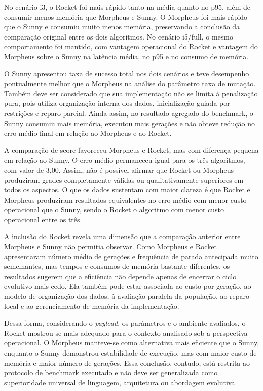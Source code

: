 No cenário i3, o Rocket foi mais rápido tanto na média quanto no p95, além de consumir menos memória que Morpheus e Sunny. O Morpheus foi mais rápido que o Sunny e consumiu muito menos memória, preservando a conclusão da comparação original entre os dois algoritmos. No cenário i5/full, o mesmo comportamento foi mantido, com vantagem operacional do Rocket e vantagem do Morpheus sobre o Sunny na latência média, no p95 e no consumo de memória.

O Sunny apresentou taxa de sucesso total nos dois cenários e teve desempenho pontualmente melhor que o Morpheus na análise do parâmetro taxa de mutação. Também deve ser considerado que sua implementação não se limita à penalização pura, pois utiliza organização interna dos dados, inicialização guiada por restrições e reparo parcial. Ainda assim, no resultado agregado do benchmark, o Sunny consumiu mais memória, executou mais gerações e não obteve redução no erro médio final em relação ao Morpheus e ao Rocket.

A comparação de score favoreceu Morpheus e Rocket, mas com diferença pequena em relação ao Sunny. O erro médio permaneceu igual para os três algoritmos, com valor de 3,00. Assim, não é possível afirmar que Rocket ou Morpheus produziram grades completamente válidas ou qualitativamente superiores em todos os aspectos. O que os dados sustentam com maior clareza é que Rocket e Morpheus produziram resultados equivalentes no erro médio com menor custo operacional que o Sunny, sendo o Rocket o algoritmo com menor custo operacional entre os três.

A inclusão do Rocket revela uma dimensão que a comparação anterior entre Morpheus e Sunny não permitia observar. Como Morpheus e Rocket apresentaram número médio de gerações e frequência de parada antecipada muito semelhantes, mas tempos e consumos de memória bastante diferentes, os resultados sugerem que a eficiência não depende apenas de encerrar o ciclo evolutivo mais cedo. Ela também pode estar associada ao custo por geração, ao modelo de organização dos dados, à avaliação paralela da população, ao reparo local e ao gerenciamento de memória da implementação.

Dessa forma, considerando o \textit{payload}, os parâmetros e o ambiente avaliados, o Rocket mostrou-se mais adequado para o contexto analisado sob a perspectiva operacional. O Morpheus manteve-se como alternativa mais eficiente que o Sunny, enquanto o Sunny demonstrou estabilidade de execução, mas com maior custo de memória e maior número de gerações. Essa conclusão, contudo, está restrita ao protocolo de benchmark executado e não deve ser generalizada como superioridade universal de linguagem, arquitetura ou abordagem evolutiva.